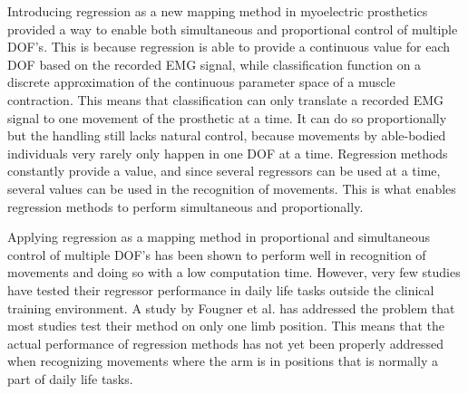Introducing regression as a new mapping method in myoelectric prosthetics provided a way to enable both simultaneous and proportional control of multiple DOF's. This is because regression is able to provide a continuous value for each DOF based on the recorded EMG signal, while classification function on a discrete approximation of the continuous parameter space of a muscle contraction. \cite{hahne2014, jiang2010} This means that classification can only translate a recorded EMG signal to one movement of the prosthetic at a time. It can do so proportionally but the handling still lacks natural control, because movements by able-bodied individuals very rarely only happen in one DOF at a time. Regression methods constantly provide a value, and since several regressors can be used at a time, several values can be used in the recognition of movements. This is what enables regression methods to perform simultaneous and proportionally. 


Applying regression as a mapping method in proportional and simultaneous control of multiple DOF's has been shown to perform well in recognition of movements and doing so with a low computation time. \cite{hahne2014} However, very few studies have tested their regressor performance in daily life tasks outside the clinical training environment. \cite{jiang2012} A study by Fougner et al. \cite{Fougner2011} has addressed the problem that most studies test their method on only one limb position. This means that the actual performance of regression methods has not yet been properly addressed when recognizing movements where the arm is in positions that is normally a part of daily life tasks. 

